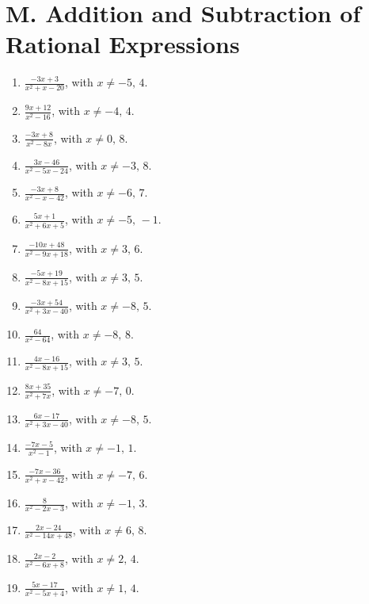 \documentclass[11pt,oneside]{book}
\begin{document}
\section*{M. Addition and Subtraction of Rational Expressions}
\begin{enumerate}[leftmargin=*,label=\textbf{M\arabic*.},itemsep=0.45\baselineskip]
\item $\displaystyle \frac{- 3 x + 3}{x^{2} + x - 20}$, with $x\ne -5,\,4$.
\item $\displaystyle \frac{9 x + 12}{x^{2} - 16}$, with $x\ne -4,\,4$.
\item $\displaystyle \frac{- 3 x + 8}{x^{2} - 8 x}$, with $x\ne 0,\,8$.
\item $\displaystyle \frac{3 x - 46}{x^{2} - 5 x - 24}$, with $x\ne -3,\,8$.
\item $\displaystyle \frac{- 3 x + 8}{x^{2} - x - 42}$, with $x\ne -6,\,7$.
\item $\displaystyle \frac{5 x + 1}{x^{2} + 6 x + 5}$, with $x\ne -5,\,-1$.
\item $\displaystyle \frac{- 10 x + 48}{x^{2} - 9 x + 18}$, with $x\ne 3,\,6$.
\item $\displaystyle \frac{- 5 x + 19}{x^{2} - 8 x + 15}$, with $x\ne 3,\,5$.
\item $\displaystyle \frac{- 3 x + 54}{x^{2} + 3 x - 40}$, with $x\ne -8,\,5$.
\item $\displaystyle \frac{64}{x^{2} - 64}$, with $x\ne -8,\,8$.
\item $\displaystyle \frac{4 x - 16}{x^{2} - 8 x + 15}$, with $x\ne 3,\,5$.
\item $\displaystyle \frac{8 x + 35}{x^{2} + 7 x}$, with $x\ne -7,\,0$.
\item $\displaystyle \frac{6 x - 17}{x^{2} + 3 x - 40}$, with $x\ne -8,\,5$.
\item $\displaystyle \frac{- 7 x - 5}{x^{2} - 1}$, with $x\ne -1,\,1$.
\item $\displaystyle \frac{- 7 x - 36}{x^{2} + x - 42}$, with $x\ne -7,\,6$.
\item $\displaystyle \frac{8}{x^{2} - 2 x - 3}$, with $x\ne -1,\,3$.
\item $\displaystyle \frac{2 x - 24}{x^{2} - 14 x + 48}$, with $x\ne 6,\,8$.
\item $\displaystyle \frac{2 x - 2}{x^{2} - 6 x + 8}$, with $x\ne 2,\,4$.
\item $\displaystyle \frac{5 x - 17}{x^{2} - 5 x + 4}$, with $x\ne 1,\,4$.

\end{enumerate}
\end{document}
